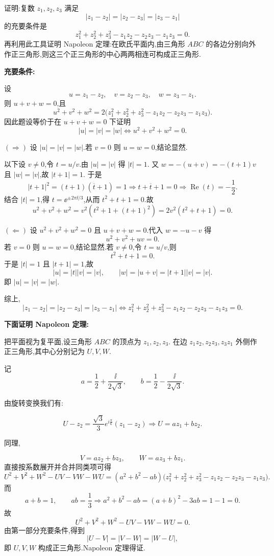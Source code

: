 \begin{problem}
证明:复数 $z_1, z_2, z_3$ 满足
\[
|z_1-z_2| = |z_2-z_3| = |z_3-z_1|
\]
的充要条件是
\[
z_1^2 + z_2^2 + z_3^2 - z_1z_2 - z_2z_3 - z_1z_3 = 0.
\]
再利用此工具证明 Napoleon 定理:在欧氏平面内,由三角形 $ABC$ 的各边分别向外作正三角形,则这三个正三角形的中心两两相连可构成正三角形.

\begin{solution}
\textbf{充要条件:}

设
\[
u=z_1-z_2,\quad v=z_2-z_3,\quad w=z_3-z_1.
\]
则 $u+v+w=0$,且
\[
u^2+v^2+w^2
=2\bigl(z_1^2+z_2^2+z_3^2-z_1z_2-z_2z_3-z_1z_3\bigr).
\]
因此题设等价于在 $u+v+w=0$ 下证明
\[
|u|=|v|=|w|
\iff
u^2+v^2+w^2=0.
\]

$(\Rightarrow)$ 设 $|u|=|v|=|w|$.若 $v=0$ 则 $u=w=0$,结论显然.

以下设 $v\ne0$,令 $t=u/v$.由 $|u|=|v|$ 得 $|t|=1$.
又 $w=-(u+v)=-(t+1)v$ 且 $|w|=|v|$,故 $|t+1|=1$.
于是
\[
|t+1|^2=(t+1)(\overline t+1)=1
\Longrightarrow t+\overline t+1=0
\Longrightarrow \operatorname{Re}(t)=-\frac12.
\]
结合 $|t|=1$,得 $t=\ee^{\pm2\pi\ii/3}$,从而 $t^2+t+1=0$.故
\[
u^2+v^2+w^2
=v^2\!\left(t^2+1+(t+1)^2\right)
=2v^2(t^2+t+1)=0.
\]

$(\Leftarrow)$ 设 $u^2+v^2+w^2=0$ 且 $u+v+w=0$.代入 $w=-u-v$ 得
\[
u^2+v^2+uv=0.
\]
若 $v=0$ 则 $u=w=0$,结论显然.若 $v\ne0$,令 $t=u/v$,则
\[
t^2+t+1=0.
\]
于是 $|t|=1$ 且 $|t+1|=1$,故
\[
|u|=|t||v|=|v|,\qquad
|w|=|u+v|=|t+1||v|=|v|.
\]
即 $|u|=|v|=|w|$.

综上,
\[
|z_1-z_2|=|z_2-z_3|=|z_3-z_1|
\iff
z_1^2+z_2^2+z_3^2-z_1z_2-z_2z_3-z_1z_3=0.
\]

\textbf{下面证明 Napoleon 定理:}

把平面视为复平面,设三角形 $ABC$ 的顶点为 $z_1,z_2,z_3$.
在边 $z_1z_2,z_2z_3,z_3z_1$ 外侧作正三角形,其中心分别记为 $U,V,W$.

记
\[
a=\frac12+\frac{\ii}{2\sqrt3},\qquad
b=\frac12-\frac{\ii}{2\sqrt3}.
\]

由旋转变换我们有:

\[
    U - z_2 = \frac{\sqrt{3}}{3} e^{i \frac{\pi}{6}}(z_1 - z_2) \Rightarrow U = az_1 + bz_2.
\]

同理,

\[
V=az_2+bz_3,\qquad
W=az_3+bz_1.
\]
直接按系数展开并合并同类项可得
\[
U^2+V^2+W^2-UV-VW-WU
=(a^2+b^2-ab)\bigl(z_1^2+z_2^2+z_3^2-z_1z_2-z_2z_3-z_1z_3\bigr).
\]
而
\[
a+b=1,\qquad ab=\frac13
\Longrightarrow
a^2+b^2-ab=(a+b)^2-3ab=1-1=0.
\]
故
\[
U^2+V^2+W^2-UV-VW-WU=0.
\]
由第一部分充要条件,得到
\[
|U-V|=|V-W|=|W-U|,
\]
即 $U,V,W$ 构成正三角形.Napoleon 定理得证.
\end{solution}
\end{problem}

